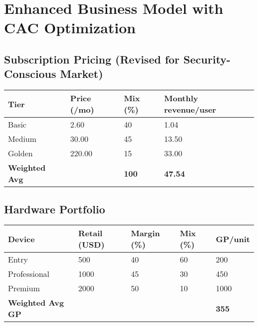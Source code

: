 \documentclass[11pt]{article}
\begin{document}
\section{Enhanced Business Model with CAC Optimization}

\subsection{Subscription Pricing (Revised for Security-Conscious Market)}
\begin{table}[H]
\centering
\begin{tabularx}{\linewidth}{l Y Y Y}
\toprule
Tier & Price (/mo) & Mix (\%) & Monthly revenue/user \\\midrule
Basic   & 2.60  & 40 & 1.04 \\
Medium  & 30.00 & 45 & 13.50 \\
Golden  & 220.00& 15 & 33.00 \\\midrule
\textbf{Weighted Avg} &  & \textbf{100} & \textbf{47.54} \\
\bottomrule
\end{tabularx}
\end{table}

\subsection{Hardware Portfolio}
\begin{table}[H]
\centering
\begin{tabularx}{\linewidth}{l Y Y Y Y}
\toprule
Device & Retail (USD) & Margin (\%) & Mix (\%) & GP/unit \\\midrule
Entry        & 500  & 40 & 60 & 200 \\
Professional & 1000 & 45 & 30 & 450 \\
Premium      & 2000 & 50 & 10 & 1000 \\\midrule
\textbf{Weighted Avg GP} &  &  &  & \textbf{355} \\
\bottomrule
\end{tabularx}
\end{table}
\end{document}
